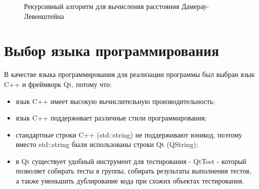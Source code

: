 \documentclass[14pt]{report}
\begin{document}
\begin{figure}
\caption{Рекурсивный алгоритм для вычисления расстояния Дамерау-Левенштейна}
\label{fig:image}
\end{figure}


\section*{Выбор языка программирования}

В качестве языка программирования для реализации программы был выбран язык C++ и фреймворк Qt, потому что:
\begin{itemize}
	\item язык C++ имеет высокую вычислительную производительность;
	\item язык C++ поддерживает различные стили программирования;
	\item стандартные строки C++ (std::string) не поддерживают юникод, поэтому вместо std::string были использованы строки Qt (QString);
	\item в Qt существует удобный инструмент для тестирования - QtTest - который позволяет собирать тесты в группы, собирать результаты выполнения тестов, а также уменьшить дублирование кода при схожих объектах тестирования.
\end{itemize}
\end{document}
